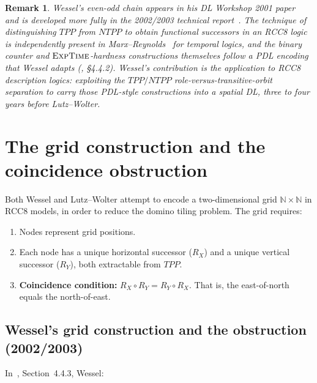 \documentclass[11pt]{article}
\newtheorem{remark}[theorem]{Remark}
\newcommand{\naturals}{\mathbb{N}}
\newcommand{\EXPTIME}{\textsc{ExpTime}}
\begin{document}
\begin{remark}
  Wessel's even-odd chain appears in his DL Workshop 2001 paper~\cite{Wessel2001}
  and is developed more fully in the 2002/2003 technical
  report~\cite{Wessel2003}.  The technique of distinguishing $TPP$ from $NTPP$
  to obtain functional successors in an RCC8 logic is independently present in
  Marx--Reynolds~\cite{MarxReynolds1999} for temporal logics, and the binary
  counter and $\EXPTIME$-hardness constructions themselves follow a PDL encoding
  that Wessel adapts (\cite{Wessel2003}, \S4.4.2).  Wessel's contribution is the
  \emph{application to RCC8 description logics}: exploiting the $TPP/NTPP$
  role-versus-transitive-orbit separation to carry those PDL-style constructions
  into a spatial DL, three to four years before Lutz--Wolter.
\end{remark}

\section{The grid construction and the coincidence obstruction}
\label{sec:grid}

Both Wessel and Lutz--Wolter attempt to encode a two-dimensional grid
$\naturals \times \naturals$ in RCC8 models, in order to reduce the domino
tiling problem.  The grid requires:
\begin{enumerate}[label=(G\arabic*)]
  \item\label{g:nodes} Nodes represent grid positions.
  \item\label{g:func} Each node has a unique horizontal successor ($R_X$) and
    a unique vertical successor ($R_Y$), both extractable from $TPP$.
  \item\label{g:coinc} \textbf{Coincidence condition:}
    $R_X \circ R_Y = R_Y \circ R_X$.
    That is, the east-of-north equals the north-of-east.
\end{enumerate}

\subsection{Wessel's grid construction and the obstruction (2002/2003)}

In~\cite{Wessel2003}, Section~4.4.3, Wessel:
\end{document}
